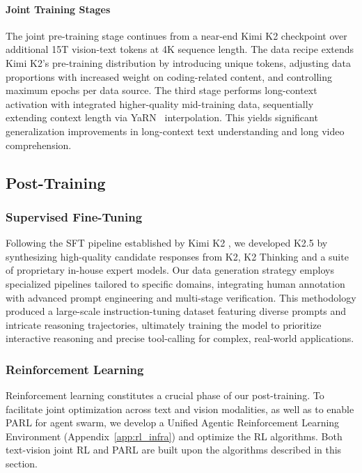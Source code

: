 \paragraph{Joint Training Stages}
The joint pre-training stage continues from a near-end Kimi K2 checkpoint over additional 15T vision-text tokens at 4K sequence length. The data recipe extends Kimi K2's pre-training distribution by introducing unique tokens, adjusting data proportions with increased weight on coding-related content, and controlling maximum epochs per data source. The third stage performs long-context activation with integrated higher-quality mid-training data, sequentially extending context length via YaRN~\citep{peng2023yarn} interpolation. This yields significant generalization improvements in long-context text understanding and long video comprehension.



\subsection{Post-Training}
\subsubsection{Supervised Fine-Tuning}

Following the SFT pipeline established by Kimi K2 \citep{team2025kimik2}, we developed K2.5 by synthesizing high-quality candidate responses from K2, K2 Thinking and a suite of proprietary in-house expert models. Our data generation strategy employs specialized pipelines tailored to specific domains, integrating human annotation with advanced prompt engineering and multi-stage verification. 
This methodology produced a large-scale instruction-tuning dataset featuring diverse prompts and intricate reasoning trajectories, ultimately training the model to prioritize interactive reasoning and precise tool-calling for complex, real-world applications.




\subsubsection{Reinforcement Learning}
Reinforcement learning constitutes a crucial phase of our post-training. 
To facilitate joint optimization across text and vision modalities, as well as to enable PARL for agent swarm, we develop a Unified Agentic Reinforcement Learning Environment (Appendix~\ref{app:rl_infra}) and optimize the RL algorithms. 
Both text-vision joint RL and PARL are built upon the algorithms described in this section.
